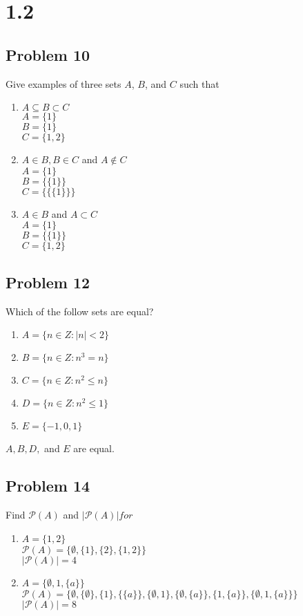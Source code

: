 \documentclass{article}
\begin{document}
	
	\section*{1.2}
	\subsection*{Problem 10}
	Give examples of three sets $A$, $B$, and $C$ such that
	\begin{enumerate}[label=(\alph*)]
		\item $A\subseteq B\subset C$\\
		$A=\{1\}$\\
		$B=\{1\}$\\
		$C=\{1,2\}$
		\item $A\in B, B\in C$ and $A\notin C$\\
		$A=\{1\}$\\
		$B=\{\{1\}\}$\\
		$C=\{\{\{1\}\}\}$
		\item $A\in B$ and $A\subset C$\\
		$A=\{1\}$\\
		$B=\{\{1\}\}$\\
		$C=\{1,2\}$
	\end{enumerate}

	\subsection*{Problem 12}
	Which of the follow sets are equal?
	\begin{enumerate}[label=(\alph*)]
		\item $A=\{n\in Z: |n|<2\}$
		\item $B=\{n\in Z: n^3=n\}$
		\item $C=\{n\in Z: n^2\leq n\}$
		\item $D=\{n\in Z: n^2\leq1\}$
		\item $E=\{-1,0,1\}$
	\end{enumerate}
	$A,B,D,$ and $E$ are equal.
	\subsection*{Problem 14}
	Find $\mathcal{P}(A)$ and $|\mathcal{P}(A)| for$
	\begin{enumerate}[label=(\alph*)]
		\item $A=\{1,2\}$\\
		$\mathcal{P}(A)=\{\emptyset,\{1\},\{2\},\{1,2\}\}$\\
		$|\mathcal{P}(A)|=4$
		\item $A=\{\emptyset,1,\{a\}\}$\\
		$\mathcal{P}(A)=\{\emptyset,\{\emptyset\},\{1\},\{\{a\}\},\{\emptyset,1\},\{\emptyset,\{a\}\},\{1,\{a\}\},\{\emptyset,1,\{a\}\}\}$\\
		$|\mathcal{P}(A)|=8$
	\end{enumerate}
\end{document}
